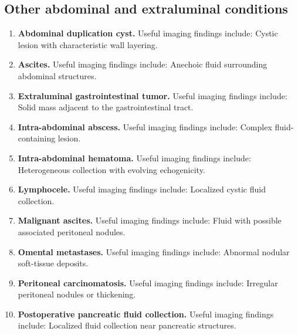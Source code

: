 \subsection{Other abdominal and extraluminal conditions}
\begin{enumerate}[leftmargin=*,itemsep=0.45em,topsep=0.4em]
\item \textbf{Abdominal duplication cyst.} Useful imaging findings include: Cystic lesion with characteristic wall layering.
\item \textbf{Ascites.} Useful imaging findings include: Anechoic fluid surrounding abdominal structures.
\item \textbf{Extraluminal gastrointestinal tumor.} Useful imaging findings include: Solid mass adjacent to the gastrointestinal tract.
\item \textbf{Intra-abdominal abscess.} Useful imaging findings include: Complex fluid-containing lesion.
\item \textbf{Intra-abdominal hematoma.} Useful imaging findings include: Heterogeneous collection with evolving echogenicity.
\item \textbf{Lymphocele.} Useful imaging findings include: Localized cystic fluid collection.
\item \textbf{Malignant ascites.} Useful imaging findings include: Fluid with possible associated peritoneal nodules.
\item \textbf{Omental metastases.} Useful imaging findings include: Abnormal nodular soft-tissue deposits.
\item \textbf{Peritoneal carcinomatosis.} Useful imaging findings include: Irregular peritoneal nodules or thickening.
\item \textbf{Postoperative pancreatic fluid collection.} Useful imaging findings include: Localized fluid collection near pancreatic structures.
\end{enumerate}



